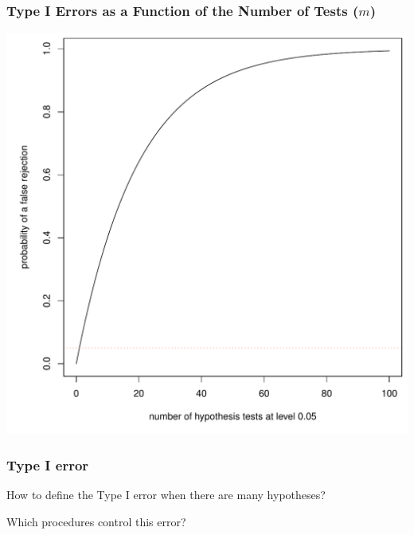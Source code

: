 \documentclass[xcolor={pdftex,dvipsnames,table}]{beamer}
\newcommand{\bb}[1]{\begin{block}{#1}}
\newcommand{\eb}{\end{block}}
\begin{document}
\begin{frame}
\frametitle{Type I Errors as a Function of the Number of Tests ($m$)}

\includegraphics[scale=.3]{plaatjes/typeI}
\end{frame}


\begin{frame}
\frametitle{Type I error}
\bb{How to define the Type I error when there are many hypotheses?}
\eb
\bb{Which procedures control this error?}
\eb
\end{frame}
\end{document}
